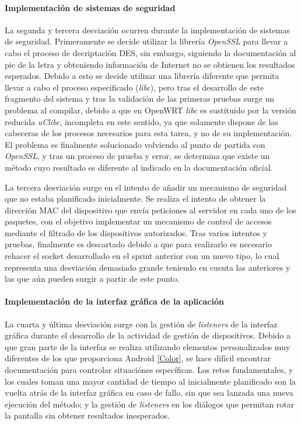 \documentclass[12pt]{article}
\begin{document}
        \paragraph{ Implementación de sistemas de seguridad}
        La segunda y tercera desviación ocurren durante la implementación de sistemas de seguridad. Primeramente se decide utilizar la librería \textit{OpenSSL} para llevar a cabo el proceso de decriptación DES, sin embargo, siguiendo la documentación al pie de la letra y obteniendo información de Internet no se obtienen los resultados esperados. Debido a esto se decide utilizar una librería diferente que permita llevar a cabo el proceso especificado (\textit{libc}), pero tras el desarrollo de este fragmento del sistema y tras la validación de las primeras pruebas surge un problema al compilar, debido a que en OpenWRT \textit{libc} es sustituido por la versión reducida \textit{uClibc}, incompleta en este sentido, ya que solamente dispone de las cabeceras de los procesos necesarios para esta tarea, y no de su implementación. El problema es finalmente solucionado volviendo al punto de partida con \textit{OpenSSL}, y tras un proceso de prueba y error, se determina que existe un método cuyo resultado es diferente al indicado en la documentación oficial.

        La tercera desviación surge en el intento de añadir un mecanismo de seguridad que no estaba planificado inicialmente. Se realiza el intento de obtener la dirección MAC del dispositivo que envía peticiones al servidor en cada uno de los paquetes, con el objetivo implementar un mecanismo de control de accesos mediante el filtrado de los dispositivos autorizados. Tras varios intentos y pruebas, finalmente es descartado debido a que para realizarlo es necesario rehacer el socket desarrollado en el sprint anterior con un nuevo tipo, lo cual representa una desviación demasiado grande teniendo en cuenta las anteriores y las que aún pueden surgir a partir de este punto.

        \paragraph{ Implementación de la interfaz gráfica de la aplicación}
        La cuarta y última desviación surge con la gestión de \textit{listeners} de la interfaz gráfica durante el desarrollo de la actividad de gestión de dispositivos. Debido a que gran parte de la interfaz se realiza utilizando elementos personalizados muy diferentes de los que proporciona Android \ref{Color}, se hace difícil encontrar documentación para controlar situaciónes específicas. Los retos fundamentales, y los cuales toman una mayor cantidad de tiempo al inicialmente planificado son la vuelta atrás de la interfaz gráfica en caso de fallo, sin que sea lanzada una nueva ejecución del método; y la gestión de \textit{listeners} en los diálogos que permitan rotar la pantalla sin obtener resultados inesperados.
        
\end{document}
